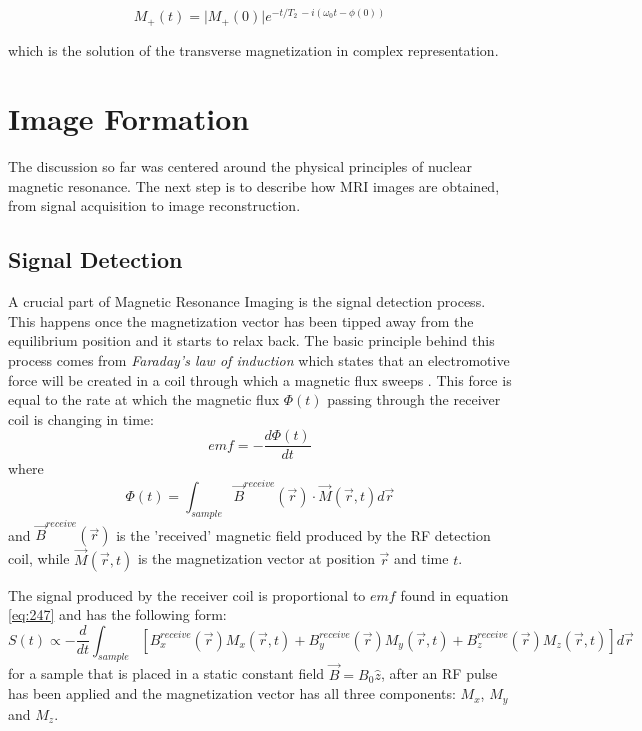 \begin{equation} \label{eq:246}
    M_{+}(t) = \lvert M_{+}(0) \rvert e^{-t/T_2 \, -i (\omega_0 t - \phi(0))}
\end{equation}

which is the solution of the transverse magnetization in complex representation.



\section{Image Formation}
The discussion so far was centered around the physical principles of nuclear magnetic resonance. The next step is to describe how MRI images are obtained, from signal acquisition to image reconstruction. 

\subsection{Signal Detection}
A crucial part of Magnetic Resonance Imaging is the signal detection process. This happens once the magnetization vector has been tipped away from the equilibrium position and it starts to relax back. The basic principle behind this process comes from \textit{Faraday's law of induction} which states that an electromotive force will be created in a coil through which a magnetic flux sweeps \cite{Haacke1999}. This force is equal to the rate at which the magnetic flux $\Phi(t)$ passing through the receiver coil is changing in time:
\begin{equation} \label{eq:247}
    emf = - \frac{d \Phi(t)}{dt}
\end{equation}
where 
\begin{equation}
    \Phi(t) = \int_{sample} \vec{B}^{receive}(\vec{r}) \cdot \vec{M}(\vec{r}, t) d\vec{r}
\end{equation}
and $\vec{B}^{receive}(\vec{r})$ is the 'received' magnetic field produced by the RF detection coil, while $\vec{M}(\vec{r}, t)$ is the magnetization vector at position $\vec{r}$ and time $t$.

The signal produced by the receiver coil is proportional to $emf$ found in equation \ref{eq:247} and has the following form:
\begin{equation}
    S(t) \propto - \frac{d}{dt} 
    \int_{sample}
          [B_x^{receive} (\vec{r}) M_x (\vec{r}, t) + 
          B_y^{receive} (\vec{r}) M_y (\vec{r}, t) + 
          B_z^{receive} (\vec{r}) M_z (\vec{r}, t)]  d\vec{r}
\end{equation}
for a sample that is placed in a static constant field $\vec{B} = B_0 \hat{z}$, after an RF pulse has been applied and the magnetization vector has all three components: $M_x$, $M_y$ and $M_z$.

